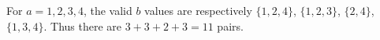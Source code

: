 For $a=1,2,3,4$, the valid $b$ values are respectively $\{1,2,4\}$, $\{1,2,3\}$, $\{2,4\}$, $\{1,3,4\}$. Thus there are $3+3+2+3=\boxed{11}$ pairs.

